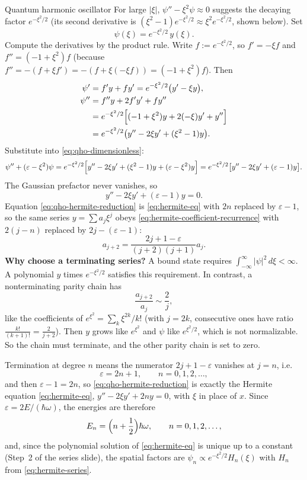 \documentclass[11pt]{beamer}
\begin{document}
\begin{frame}[allowframebreaks=1.00]{Quantum harmonic oscillator}
For large $|\xi|$, $\psi''-\xi^2\psi\approx0$ suggests the decaying factor
$e^{-\xi^2/2}$ (its second derivative is $(\xi^2-1)e^{-\xi^2/2}\approx\xi^2e^{-\xi^2/2}$, shown below).  Set
\[
  \psi(\xi)=e^{-\xi^2/2}\,y(\xi).
\]
Compute the derivatives by the product rule.  Write $f:=e^{-\xi^2/2}$, so
$f'=-\xi f$ and $f''=(-1+\xi^2)f$ (because
$f''=-(f+\xi f')=-(f+\xi(-\xi f))=(-1+\xi^2)f$).  Then
\begin{align*}
  \psi'
  &=f'y+fy'
  =e^{-\xi^2/2}\bigl(y'-\xi y\bigr),\\
  \psi''
  &=f''y+2f'y'+fy''\\
  &=e^{-\xi^2/2}\Bigl[
      (-1+\xi^2)y
      +2(-\xi)y'
      +y''
    \Bigr]\\
  &=e^{-\xi^2/2}\bigl(
      y''-2\xi y'+(\xi^2-1)y
    \bigr).
\end{align*}
Substitute into \eqref{eq:qho-dimensionless}:
\[
  \psi''+(\varepsilon-\xi^2)\psi
  =e^{-\xi^2/2}\Bigl[
      y''-2\xi y'+(\xi^2-1)y
      +(\varepsilon-\xi^2)y
    \Bigr]
  =e^{-\xi^2/2}\bigl[
      y''-2\xi y'+(\varepsilon-1)y
    \bigr].
\]
The Gaussian prefactor never vanishes, so
\begin{equation}
  y''-2\xi y'+(\varepsilon-1)y=0.
  \label{eq:qho-hermite-reduction}
\end{equation}
Equation \eqref{eq:qho-hermite-reduction} is \eqref{eq:hermite-eq} with $2n$ replaced by $\varepsilon-1$,
so the same series $y=\sum a_j\xi^j$ obeys \eqref{eq:hermite-coefficient-recurrence} with
$2(j-n)$ replaced by $2j-(\varepsilon-1)$:
\[
  a_{j+2}=\frac{2j+1-\varepsilon}{(j+2)(j+1)}a_j.
\]
\textbf{Why choose a terminating series?}
A bound state requires $\int_{-\infty}^{\infty}|\psi|^2\,d\xi<\infty$.
A polynomial $y$ times $e^{-\xi^2/2}$ satisfies this requirement.
In contrast, a nonterminating parity chain has
\[
 \frac{a_{j+2}}{a_j}\sim\frac{2}{j},
\]
like the coefficients of $e^{\xi^2}=\sum_k\xi^{2k}/k!$ (with $j=2k$, consecutive ones have ratio
$\tfrac{k!}{(k+1)!}=\tfrac{2}{j+2}$). Then $y$ grows like $e^{\xi^2}$ and $\psi$ like
$e^{\xi^2/2}$, which is not normalizable. So the chain must terminate, and the other parity
chain is set to zero.

\par\framebreak\par
Termination at degree $n$ means the numerator $2j+1-\varepsilon$ vanishes at $j=n$, i.e.
\[
  \varepsilon=2n+1,\qquad n=0,1,2,\ldots,
\]
and then $\varepsilon-1=2n$, so \eqref{eq:qho-hermite-reduction} is exactly the Hermite
equation \eqref{eq:hermite-eq}, $y''-2\xi y'+2ny=0$, with $\xi$ in place of $x$.  Since $\varepsilon=2E/(\hbar\omega)$, the energies are
therefore
\begin{equation}
  E_n=\Bigl(n+\frac12\Bigr)\hbar\omega,
  \qquad n=0,1,2,\ldots,
  \label{eq:energy-levels}
\end{equation}
and, since the polynomial solution of \eqref{eq:hermite-eq} is unique up to a constant (Step~2 of
the series slide), the spatial factors are
$\psi_n\propto e^{-\xi^2/2}H_n(\xi)$ with $H_n$ from \eqref{eq:hermite-series}.


\end{frame}
\end{document}
